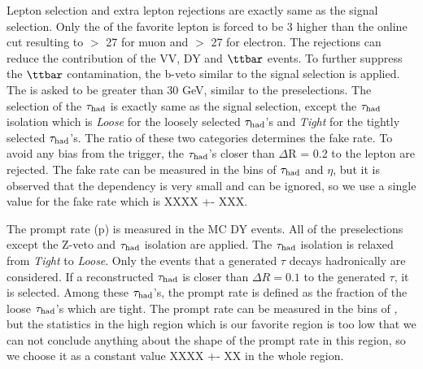 Lepton selection and extra lepton rejections are exactly same as the signal selection. Only the \pt of the favorite lepton is forced to 
be 3 \GeV higher than the online cut resulting to \pt $>$ 27 \GeV for muon and \pt $>$ 27 \GeV for electron.
The rejections can reduce the contribution of the VV, DY and $\ttbar$ events. To further suppress the $\ttbar$ contamination, the b-veto 
similar to the signal selection is applied. The \MET is asked to be greater than 30 GeV, similar to the preselections. The selection of the $\tau_{\rm had}$ is 
exactly same as the signal selection, except the $\tau_{\rm had}$ isolation which is {\it Loose} for the loosely selected $\tau_{\rm had}$'s and {\it Tight} for the 
tightly selected $\tau_{\rm had}$'s.
The ratio of these two categories determines the fake rate. To avoid any bias from the trigger, the $\tau_{\rm had}$'s closer than $\Delta$R = 0.2 to the 
lepton are rejected. 
The fake rate can be measured in the bins of $\tau_{\rm had}$ \pt and $\eta$, but it is observed that the dependency is very small and can be ignored, 
so we use a single value for the fake rate which is XXXX +- XXX.

The prompt rate (p) is measured in the MC DY events. All of the preselections except the Z-veto and $\tau_{\rm had}$ isolation are applied. The $\tau_{\rm had}$ isolation 
is relaxed from {\it Tight} to {\it Loose}. Only the events that a generated $\tau$ decays hadronically are considered. If a reconstructed $\tau_{\rm had}$ is 
closer than $\Delta R = 0.1$ to the generated $\tau$, it is selected. Among these $\tau_{\rm had}$'s, the prompt rate is defined as the fraction of the loose $\tau_{\rm had}$'s 
which are tight. The prompt rate can be measured in the bins of \mttwo, but the statistics in the high \mttwo region which is our favorite 
region is too low that we can not conclude anything about the shape of the prompt rate in this region, so we choose it as a constant value
XXXX +- XX in the whole \mttwo region.



